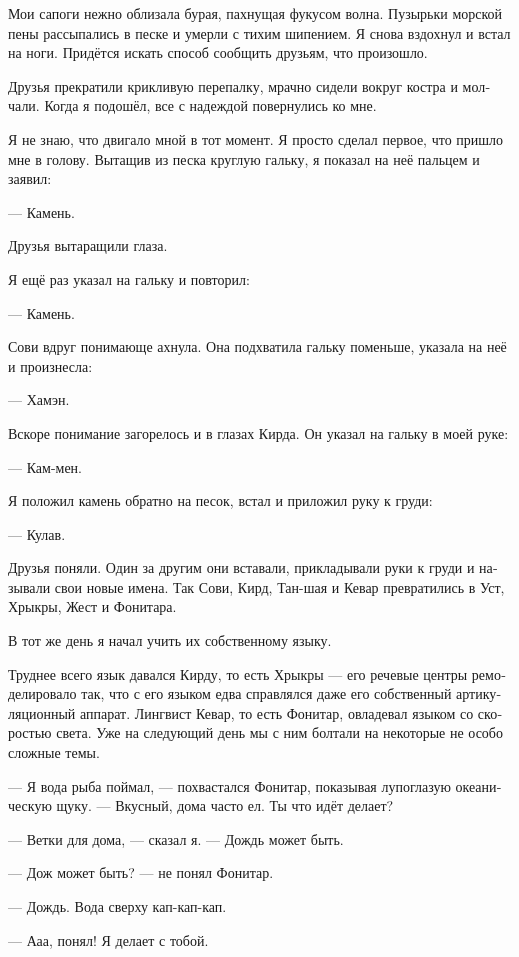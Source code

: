 \documentclass[a4paper,12pt,fleqn]{book}\usepackage{polyglossia}\setdefaultlanguage[babelshorthands=true]{russian}\setotherlanguage{english}\defaultfontfeatures{Ligatures=TeX,Mapping=tex-text}
\newcommand{\asterism}{\vspace{1em}{\centering\Large\bfseries$\ast~\ast~\ast$\par}\vspace{1em}}
\begin{document}
Мои сапоги нежно облизала бурая, пахнущая фукусом волна.
Пузырьки морской пены рассыпались в песке и умерли с тихим шипением.
Я снова вздохнул и встал на ноги.
Придётся искать способ сообщить друзьям, что произошло.

\asterism

Друзья прекратили крикливую перепалку, мрачно сидели вокруг костра и молчали.
Когда я подошёл, все с надеждой повернулись ко мне.

Я не знаю, что двигало мной в тот момент.
Я просто сделал первое, что пришло мне в голову.
Вытащив из песка круглую гальку, я показал на неё пальцем и заявил:

--- Камень.

Друзья вытаращили глаза.

Я ещё раз указал на гальку и повторил:

--- Камень.

Сови вдруг понимающе ахнула.
Она подхватила гальку поменьше, указала на неё и произнесла:

--- Хамэн.

Вскоре понимание загорелось и в глазах Кирда.
Он указал на гальку в моей руке:

--- Кам-мен.

Я положил камень обратно на песок, встал и приложил руку к груди:

--- Кулав.

Друзья поняли.
Один за другим они вставали, прикладывали руки к груди и называли свои новые имена.
Так Сови, Кирд, Тан-шая и Кевар превратились в Уст, Хрыкры, Жест и Фонитара.

В тот же день я начал учить их собственному языку.

\asterism

Труднее всего язык давался Кирду, то есть Хрыкры --- его речевые центры ремоделировало так, что с его языком едва справлялся даже его собственный артикуляционный аппарат.
Лингвист Кевар, то есть Фонитар, овладевал языком со скоростью света.
Уже на следующий день мы с ним болтали на некоторые не особо сложные темы.

--- Я вода рыба поймал, --- похвастался Фонитар, показывая лупоглазую океаническую щуку.
--- Вкусный, дома часто ел.
Ты что идёт делает?

--- Ветки для дома, --- сказал я.
--- Дождь может быть.

--- Дож может быть? --- не понял Фонитар.

--- Дождь.
Вода сверху кап-кап-кап.

--- Ааа, понял!
Я делает с тобой.
\end{document}
